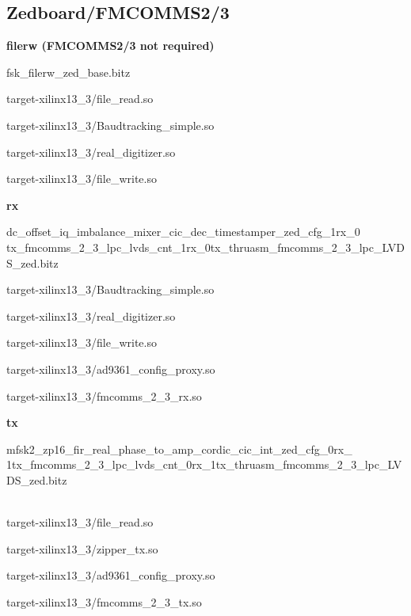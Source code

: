 \begin{appendices}
\subsection{Zedboard/FMCOMMS2/3}
	\noindent\textbf{filerw (FMCOMMS2/3 not required)}
	\begin{itemize}
	\begin{minipage}[t]{.5\textwidth}
	\item fsk\_filerw\_zed\_base.bitz
	\item target-xilinx13\_3/file\_read.so
	\item target-xilinx13\_3/Baudtracking\_simple.so
	\end{minipage}
	\begin{minipage}[t]{.5\textwidth}
	\item target-xilinx13\_3/real\_digitizer.so
	\item target-xilinx13\_3/file\_write.so
	\end{minipage}
	\end{itemize}

	\noindent\textbf{rx}
	\begin{itemize}
  \item dc\_offset\_iq\_imbalance\_mixer\_cic\_dec\_timestamper\_zed\_cfg\_1rx\_0\\
tx\_fmcomms\_2\_3\_lpc\_lvds\_cnt\_1rx\_0tx\_thruasm\_fmcomms\_2\_3\_lpc\_LVDS\_zed.bitz \\
	\begin{minipage}[t]{.5\textwidth}
	\item target-xilinx13\_3/Baudtracking\_simple.so
	\item target-xilinx13\_3/real\_digitizer.so
	\item target-xilinx13\_3/file\_write.so
	\end{minipage}
	\begin{minipage}[t]{.5\textwidth}
	\item target-xilinx13\_3/ad9361\_config\_proxy.so
	\item target-xilinx13\_3/fmcomms\_2\_3\_rx.so
	\end{minipage}
	\end{itemize}

	\noindent\textbf{tx}
	\begin{itemize}
  \item mfsk2\_zp16\_fir\_real\_phase\_to\_amp\_cordic\_cic\_int\_zed\_cfg\_0rx\_\\
1tx\_fmcomms\_2\_3\_lpc\_lvds\_cnt\_0rx\_1tx\_thruasm\_fmcomms\_2\_3\_lpc\_LVDS\_zed.bitz
\\ \\
	\begin{minipage}[t]{.5\textwidth}
	\item target-xilinx13\_3/file\_read.so
	\item target-xilinx13\_3/zipper\_tx.so
	\end{minipage}
	\begin{minipage}[t]{.5\textwidth}
	\item target-xilinx13\_3/ad9361\_config\_proxy.so
	\item target-xilinx13\_3/fmcomms\_2\_3\_tx.so
	\end{minipage}
	\end{itemize}


\end{appendices}
